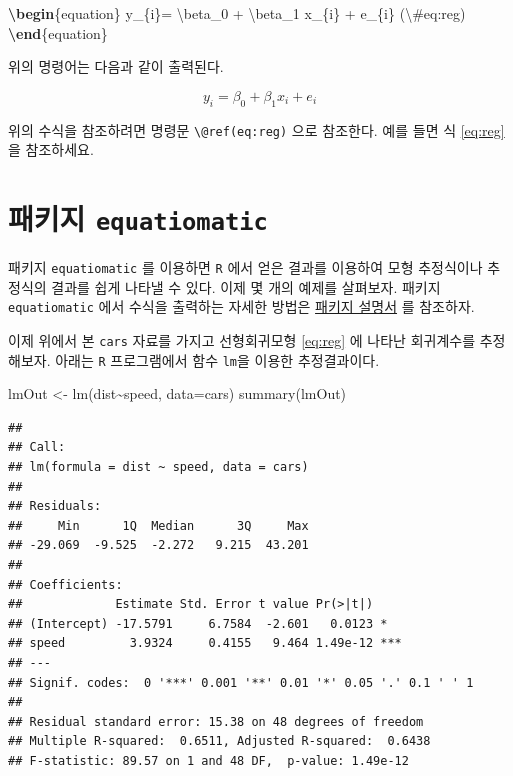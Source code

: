 \documentclass[
]{book}
\newenvironment{Shaded}{\begin{snugshade}}{\end{snugshade}}
\newcommand{\AttributeTok}[1]{\textcolor[rgb]{0.77,0.63,0.00}{#1}}
\newcommand{\ExtensionTok}[1]{#1}
\newcommand{\FunctionTok}[1]{\textcolor[rgb]{0.00,0.00,0.00}{#1}}
\newcommand{\KeywordTok}[1]{\textcolor[rgb]{0.13,0.29,0.53}{\textbf{#1}}}
\newcommand{\NormalTok}[1]{#1}
\newcommand{\OtherTok}[1]{\textcolor[rgb]{0.56,0.35,0.01}{#1}}
\newcommand{\SpecialCharTok}[1]{\textcolor[rgb]{0.00,0.00,0.00}{#1}}
\newcommand{\SpecialStringTok}[1]{\textcolor[rgb]{0.31,0.60,0.02}{#1}}
\theoremstyle{definition}
\theoremstyle{definition}
\theoremstyle{definition}
\theoremstyle{definition}
\theoremstyle{remark}
\begin{document}
\begin{Shaded}
\begin{Highlighting}[]
\KeywordTok{\textbackslash{}begin}\NormalTok{\{}\ExtensionTok{equation}\NormalTok{\}}\SpecialStringTok{ }
\SpecialStringTok{  y\_\{i\}= }\SpecialCharTok{\textbackslash{}beta}\SpecialStringTok{\_0 + }\SpecialCharTok{\textbackslash{}beta}\SpecialStringTok{\_1 x\_\{i\} + e\_\{i\}}
\SpecialStringTok{  (}\SpecialCharTok{\textbackslash{}\#}\SpecialStringTok{eq:reg)}
\KeywordTok{\textbackslash{}end}\NormalTok{\{}\ExtensionTok{equation}\NormalTok{\} }
\end{Highlighting}
\end{Shaded}

위의 명령어는 다음과 같이 출력된다.

\begin{equation} 
  y_{i}= \beta_0 + \beta_1 x_{i} + e_{i}
\label{eq:reg}
\end{equation}

위의 수식을 참조하려면 명령문 \texttt{\textbackslash{}@ref(eq:reg)} 으로 참조한다. 예를 들면 식 \eqref{eq:reg} 을 참조하세요.

\hypertarget{uxd328uxd0a4uxc9c0-equatiomatic}{%
\section{\texorpdfstring{패키지 \texttt{equatiomatic}}{패키지 equatiomatic}}\label{uxd328uxd0a4uxc9c0-equatiomatic}}

패키지 \texttt{equatiomatic} 를 이용하면 \texttt{R} 에서 얻은 결과를 이용하여 모형 추정식이나 추정식의 결과를
쉽게 나타낼 수 있다. 이제 몇 개의 예제를 살펴보자. 패키지 \texttt{equatiomatic} 에서 수식을 출력하는
자세한 방법은 \href{https://datalorax.github.io/equatiomatic/index.html}{패키지 설명서} 를 참조하자.

이제 위에서 본 \texttt{cars} 자료를 가지고 선형회귀모형 \eqref{eq:reg} 에 나타난 회귀계수를 추정해보자. 아래는 \texttt{R} 프로그램에서 함수 \texttt{lm}을 이용한 추정결과이다.

\begin{Shaded}
\begin{Highlighting}[]
\NormalTok{lmOut }\OtherTok{\textless{}{-}} \FunctionTok{lm}\NormalTok{(dist}\SpecialCharTok{\textasciitilde{}}\NormalTok{speed, }\AttributeTok{data=}\NormalTok{cars)}
\FunctionTok{summary}\NormalTok{(lmOut)}
\end{Highlighting}
\end{Shaded}

\begin{verbatim}
## 
## Call:
## lm(formula = dist ~ speed, data = cars)
## 
## Residuals:
##     Min      1Q  Median      3Q     Max 
## -29.069  -9.525  -2.272   9.215  43.201 
## 
## Coefficients:
##             Estimate Std. Error t value Pr(>|t|)    
## (Intercept) -17.5791     6.7584  -2.601   0.0123 *  
## speed         3.9324     0.4155   9.464 1.49e-12 ***
## ---
## Signif. codes:  0 '***' 0.001 '**' 0.01 '*' 0.05 '.' 0.1 ' ' 1
## 
## Residual standard error: 15.38 on 48 degrees of freedom
## Multiple R-squared:  0.6511, Adjusted R-squared:  0.6438 
## F-statistic: 89.57 on 1 and 48 DF,  p-value: 1.49e-12
\end{verbatim}
\end{document}
